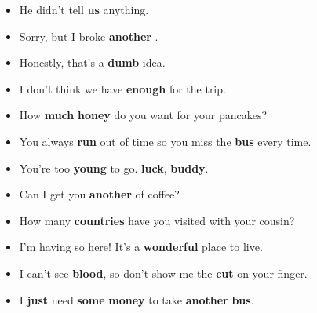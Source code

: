 \begin{itemize}
  \item He didn't tell \textbf{\textcolor{fancyorange}{u}s} anything.
  \item Sorry, but I broke \textbf{an\textcolor{fancyorange}{o}ther} .
  \item Honestly, that's a \textbf{d\textcolor{fancyorange}{u}mb} idea.
  \item I don't think we have \textbf{en\textcolor{fancyorange}{ou}gh}  for the trip.
  \item How \textbf{m\textcolor{fancyorange}{u}ch} \textbf{honey} do you want for your pancakes?
  \item You always \textbf{r\textcolor{fancyorange}{u}n} out of time so you miss the \textbf{b\textcolor{fancyorange}{u}s} every time.
  \item You're too \textbf{y\textcolor{fancyorange}{ou}ng} to go.  \textbf{l\textcolor{fancyorange}{u}ck}, \textbf{b\textcolor{fancyorange}{u}ddy}.
  \item Can I get you \textbf{an\textcolor{fancyorange}{o}ther}  of coffee?
  \item How many \textbf{c\textcolor{fancyorange}{ou}ntries} have you visited with your cousin?
  \item I'm having so   here! It's a \textbf{w\textcolor{fancyorange}{o}nderful} place to live.
  \item I can't see \textbf{bl\textcolor{fancyorange}{oo}d}, so don't show me the \textbf{c\textcolor{fancyorange}{u}t} on your finger.
  \item I \textbf{j\textcolor{fancyorange}{u}st} need \textbf{s\textcolor{fancyorange}{o}me} \textbf{m\textcolor{fancyorange}{o}ney} to take \textbf{an\textcolor{fancyorange}{o}ther} \textbf{b\textcolor{fancyorange}{u}s}.
\end{itemize}

\newpage